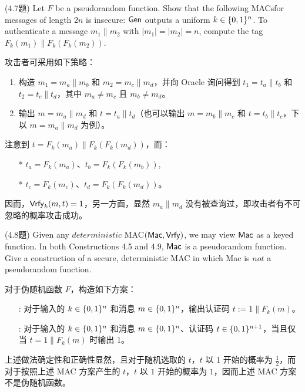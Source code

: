 \begin{questions}
    \question (4.7题) Let $F$ be a pseudorandom function. Show that the following MACsfor messages of length $2n$ is insecure: $\mathsf{Gen}$ outputs a uniform $k\in\{{0,1}\}^n$. To authenticate a message $m_1\parallel{m_2}$ with $|m_1|=|m_2|=n$, compute the tag $F_k(m_1)\parallel{F_k}(F_k(m_2))$.

        \begin{solution}
            \newline
            攻击者可采用如下策略：
            \begin{enumerate}
                \item 构造 $m_1=m_a\parallel{m_b}$ 和 $m_2=m_c\parallel{m_d}$，并向 Oracle 询问得到 $t_1=t_a\parallel{t_b}$ 和 $t_2=t_c\parallel{t_d}$，其中 $m_a\neq{m_c}$ 且 $m_b\neq{m_d}$。
                \item 输出 $m=m_a\parallel{m_d}$ 和 $t=t_a\parallel{t_d}$（也可以输出 $m=m_b\parallel{m_c}$ 和 $t=t_b\parallel{t_c}$，下以 $m=m_a\parallel{m_d}$ 为例）。
            \end{enumerate}
            注意到 $t=F_k(m_a)\parallel{F_k}(F_k(m_d))$，而：
            \begin{enumerate}
                \item[*] $t_a=F_k(m_a)$、$t_b=F_k(F_k(m_b))$,
                \item[*] $t_c=F_k(m_c)$、$t_d=F_k(F_k(m_d))$。
            \end{enumerate}
            因而，$\mathsf{Vrfy}_k(m,t)=1$，另一方面，显然 $m_a\parallel{m_d}$ 没有被查询过，即攻击者有不可忽略的概率攻击成功。
        \end{solution}

    \question (4.8题) Given any $deterministic$ MAC$(\mathsf{Mac},\mathsf{Vrfy})$, we may view $\mathsf{Mac}$ as a keyed function. In both Constructions 4.5 and 4.9, $\mathsf{Mac}$ is a pseudorandom function. Give a construction of a secure, deterministic MAC in which Mac is $not$ a pseudorandom function.

        \begin{solution}
            \newline
            对于伪随机函数 $F$，构造如下方案：
            \begin{enumerate}
                \item[\algo{Mac}:] 对于输入的 $k\in\{{0,1}\}^n$ 和消息 $m\in\{{0,1}\}^n$，输出认证码 $t:=1\parallel{F_k}(m)$。
                \item[\algo{Vrfy}:] 对于输入的 $k\in\{{0,1}\}^n$ 和消息 $m\in\{{0,1}\}^n$、认证码 $t\in\{{0,1}\}^{n+1}$，当且仅当 $t=1\parallel{F_k}(m)$ 时输出 $1$。
            \end{enumerate}
            上述做法确定性和正确性显然，且对于随机选取的 $t$，$t$ 以 $1$ 开始的概率为 $\frac{1}{2}$，而对于按照上述 MAC 方案产生的 $t$，$t$ 以 $1$ 开始的概率为 $1$，因而上述 MAC 方案不是伪随机函数。
        \end{solution}


\end{questions}
